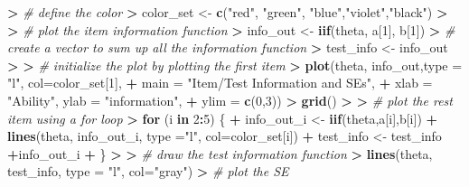 \documentclass[
]{article}
\newenvironment{Shaded}{\begin{snugshade}}{\end{snugshade}}
\newcommand{\AttributeTok}[1]{\textcolor[rgb]{0.13,0.29,0.53}{#1}}
\newcommand{\CommentTok}[1]{\textcolor[rgb]{0.56,0.35,0.01}{\textit{#1}}}
\newcommand{\ControlFlowTok}[1]{\textcolor[rgb]{0.13,0.29,0.53}{\textbf{#1}}}
\newcommand{\DecValTok}[1]{\textcolor[rgb]{0.00,0.00,0.81}{#1}}
\newcommand{\ErrorTok}[1]{\textcolor[rgb]{0.64,0.00,0.00}{\textbf{#1}}}
\newcommand{\FunctionTok}[1]{\textcolor[rgb]{0.13,0.29,0.53}{\textbf{#1}}}
\newcommand{\NormalTok}[1]{#1}
\newcommand{\OtherTok}[1]{\textcolor[rgb]{0.56,0.35,0.01}{#1}}
\newcommand{\SpecialCharTok}[1]{\textcolor[rgb]{0.81,0.36,0.00}{\textbf{#1}}}
\newcommand{\StringTok}[1]{\textcolor[rgb]{0.31,0.60,0.02}{#1}}
\begin{document}
\begin{Shaded}
\begin{Highlighting}[]
\SpecialCharTok{\textgreater{}} \CommentTok{\# define the color}
\ErrorTok{\textgreater{}}\NormalTok{ color\_set }\OtherTok{\textless{}{-}} \FunctionTok{c}\NormalTok{(}\StringTok{"red"}\NormalTok{, }\StringTok{"green"}\NormalTok{, }\StringTok{"blue"}\NormalTok{,}\StringTok{"violet"}\NormalTok{,}\StringTok{"black"}\NormalTok{)}
\SpecialCharTok{\textgreater{}} 
\ErrorTok{\textgreater{}} \CommentTok{\# plot the item information function}
\ErrorTok{\textgreater{}}\NormalTok{ info\_out }\OtherTok{\textless{}{-}} \FunctionTok{iif}\NormalTok{(theta, a[}\DecValTok{1}\NormalTok{], b[}\DecValTok{1}\NormalTok{])}
\SpecialCharTok{\textgreater{}} \CommentTok{\# create a vector to sum up all the information function}
\ErrorTok{\textgreater{}}\NormalTok{ test\_info }\OtherTok{\textless{}{-}}\NormalTok{ info\_out}
\SpecialCharTok{\textgreater{}} 
\ErrorTok{\textgreater{}} \CommentTok{\# initialize the plot by plotting the first item}
\ErrorTok{\textgreater{}} \FunctionTok{plot}\NormalTok{(theta, info\_out,}\AttributeTok{type =} \StringTok{"l"}\NormalTok{, }\AttributeTok{col=}\NormalTok{color\_set[}\DecValTok{1}\NormalTok{],}
\SpecialCharTok{+}      \AttributeTok{main =} \StringTok{"Item/Test Information and SEs"}\NormalTok{,}
\SpecialCharTok{+}      \AttributeTok{xlab =} \StringTok{"Ability"}\NormalTok{, }\AttributeTok{ylab =} \StringTok{"information"}\NormalTok{,}
\SpecialCharTok{+}      \AttributeTok{ylim =} \FunctionTok{c}\NormalTok{(}\DecValTok{0}\NormalTok{,}\DecValTok{3}\NormalTok{))}
\SpecialCharTok{\textgreater{}} \FunctionTok{grid}\NormalTok{()}
\SpecialCharTok{\textgreater{}} 
\ErrorTok{\textgreater{}} \CommentTok{\# plot the rest item using a for loop}
\ErrorTok{\textgreater{}} \ControlFlowTok{for}\NormalTok{ (i }\ControlFlowTok{in} \DecValTok{2}\SpecialCharTok{:}\DecValTok{5}\NormalTok{) \{}
\SpecialCharTok{+}\NormalTok{   info\_out\_i }\OtherTok{\textless{}{-}} \FunctionTok{iif}\NormalTok{(theta,a[i],b[i])}
\SpecialCharTok{+}   \FunctionTok{lines}\NormalTok{(theta, info\_out\_i, }\AttributeTok{type =}\StringTok{"l"}\NormalTok{, }\AttributeTok{col=}\NormalTok{color\_set[i])}
\SpecialCharTok{+}\NormalTok{   test\_info }\OtherTok{\textless{}{-}}\NormalTok{ test\_info }\SpecialCharTok{+}\NormalTok{info\_out\_i}
\SpecialCharTok{+}\NormalTok{ \}}
\SpecialCharTok{\textgreater{}} 
\ErrorTok{\textgreater{}} \CommentTok{\# draw the test information function}
\ErrorTok{\textgreater{}} \FunctionTok{lines}\NormalTok{(theta, test\_info, }\AttributeTok{type =} \StringTok{"l"}\NormalTok{, }\AttributeTok{col=}\StringTok{"gray"}\NormalTok{)}
\SpecialCharTok{\textgreater{}} \CommentTok{\# plot the SE }

\end{Highlighting}
\end{Shaded}
\end{document}

